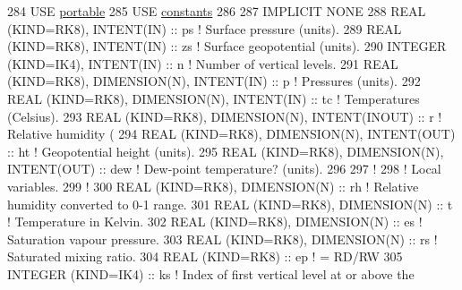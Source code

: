\begin{DoxyCode}
284 \textcolor{keywordtype}{USE }\hyperlink{namespaceportable}{portable}
285 \textcolor{keywordtype}{USE }\hyperlink{namespaceconstants}{constants}
286 
287 \textcolor{keywordtype}{IMPLICIT NONE}
288 \textcolor{keywordtype}{REAL (KIND=RK8)}, \textcolor{keywordtype}{INTENT(IN)}                       :: ps     \textcolor{comment}{! Surface pressure (units).}
289 \textcolor{keywordtype}{REAL (KIND=RK8)}, \textcolor{keywordtype}{INTENT(IN)}                       :: zs     \textcolor{comment}{! Surface geopotential (units).}
290 \textcolor{keywordtype}{INTEGER (KIND=IK4)}, \textcolor{keywordtype}{INTENT(IN)}                    :: n      \textcolor{comment}{! Number of vertical levels.}
291 \textcolor{keywordtype}{REAL (KIND=RK8)}, \textcolor{keywordtype}{DIMENSION(N)}, \textcolor{keywordtype}{INTENT(IN)}         :: p      \textcolor{comment}{! Pressures (units).}
292 \textcolor{keywordtype}{REAL (KIND=RK8)}, \textcolor{keywordtype}{DIMENSION(N)}, \textcolor{keywordtype}{INTENT(IN)}         :: tc     \textcolor{comment}{! Temperatures (Celsius).}
293 \textcolor{keywordtype}{REAL (KIND=RK8)}, \textcolor{keywordtype}{DIMENSION(N)}, \textcolor{keywordtype}{INTENT(INOUT)}      :: r      \textcolor{comment}{! Relative humidity (%
294 \textcolor{keywordtype}{REAL (KIND=RK8)}, \textcolor{keywordtype}{DIMENSION(N)}, \textcolor{keywordtype}{INTENT(OUT)}        :: ht     \textcolor{comment}{! Geopotential height (units).}
295 \textcolor{keywordtype}{REAL (KIND=RK8)}, \textcolor{keywordtype}{DIMENSION(N)}, \textcolor{keywordtype}{INTENT(OUT)}        :: dew    \textcolor{comment}{! Dew-point temperature? (units).}
296 
297 \textcolor{comment}{!}
298 \textcolor{comment}{! Local variables.}
299 \textcolor{comment}{!}
300 \textcolor{keywordtype}{REAL (KIND=RK8)}, \textcolor{keywordtype}{DIMENSION(N)}                     :: rh     \textcolor{comment}{! Relative humidity converted to 0-1 range.}
301 \textcolor{keywordtype}{REAL (KIND=RK8)}, \textcolor{keywordtype}{DIMENSION(N)}                     :: t      \textcolor{comment}{! Temperature in Kelvin.}
302 \textcolor{keywordtype}{REAL (KIND=RK8)}, \textcolor{keywordtype}{DIMENSION(N)}                     :: es     \textcolor{comment}{! Saturation vapour pressure.}
303 \textcolor{keywordtype}{REAL (KIND=RK8)}, \textcolor{keywordtype}{DIMENSION(N)}                     :: rs     \textcolor{comment}{! Saturated mixing ratio.}
304 \textcolor{keywordtype}{REAL (KIND=RK8)}                                   :: ep     \textcolor{comment}{! = RD/RW}
305 \textcolor{keywordtype}{INTEGER (KIND=IK4)}                                :: ks     \textcolor{comment}{! Index of first vertical level at or above the
}}
\end{DoxyCode}
